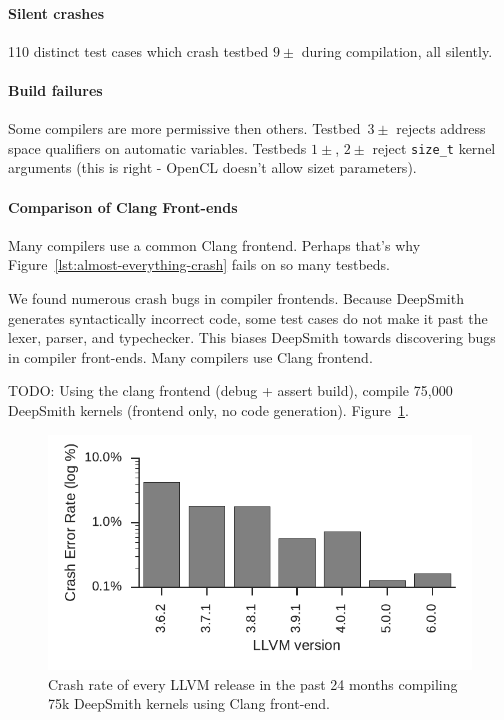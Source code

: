 \paragraph{Silent crashes} 110 distinct test cases which crash testbed $9\pm$ during compilation, all silently.


\paragraph{Build failures} Some compilers are more permissive then others. Testbed~$3\pm$ rejects address space qualifiers on automatic variables. Testbeds $1\pm$, $2\pm$ reject \texttt{size\_t} kernel arguments (this is right - OpenCL doesn't allow sizet parameters).


\paragraph{Comparison of Clang Front-ends}%

Many compilers use a common Clang frontend. Perhaps that's why Figure~\ref{lst:almost-everything-crash} fails on so many testbeds.

We found numerous crash bugs in compiler frontends. Because DeepSmith generates syntactically incorrect code, some test cases do not make it past the lexer, parser, and typechecker. This biases DeepSmith towards discovering bugs in compiler front-ends. Many compilers use Clang frontend.

TODO: Using the clang frontend (debug + assert build), compile 75,000 DeepSmith kernels (frontend only, no code generation). Figure~\ref{fig:clangs}.

\begin{figure}
  \centering %
  \includegraphics[width=.95\columnwidth]{build/img/clang-crashes}%
  \caption{%
    Crash rate of every LLVM release in the past 24 months compiling 75k DeepSmith kernels using Clang front-end.%
  }%
  \label{fig:clangs} %
\end{figure}

